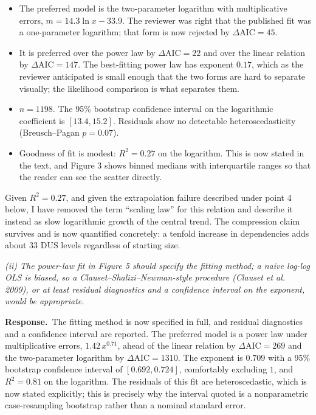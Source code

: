 \documentclass[11pt,a4paper]{article}
\newcommand{\rev}[1]{\medskip\noindent\textit{#1}\par\medskip}
\newcommand{\reply}{\noindent\textbf{Response.}\ }
\begin{document}
\begin{itemize}
\item The preferred model is the two-parameter logarithm with multiplicative
errors, $m = 14.3\ln x - 33.9$. The reviewer was right that the published fit
was a one-parameter logarithm; that form is now rejected by
$\Delta\mathrm{AIC} = 45$.
\item It is preferred over the power law by $\Delta\mathrm{AIC} = 22$ and over
the linear relation by $\Delta\mathrm{AIC} = 147$. The best-fitting power law
has exponent $0.17$, which as the reviewer anticipated is small enough that the
two forms are hard to separate visually; the likelihood comparison is what
separates them.
\item $n = 1198$. The 95\% bootstrap confidence interval on the logarithmic
coefficient is $[13.4, 15.2]$. Residuals show no detectable heteroscedasticity
(Breusch--Pagan $p = 0.07$).
\item Goodness of fit is modest: $R^2 = 0.27$ on the logarithm. This is now
stated in the text, and Figure 3 shows binned medians with interquartile ranges
so that the reader can see the scatter directly.
\end{itemize}

Given $R^2 = 0.27$, and given the extrapolation failure described under point 4
below, I have removed the term ``scaling law'' for this relation and describe it
instead as slow logarithmic growth of the central trend. The compression claim
survives and is now quantified concretely: a tenfold increase in dependencies
adds about 33 DUS levels regardless of starting size.

\rev{(ii) The power-law fit in Figure 5 should specify the fitting method; a naive
log-log OLS is biased, so a Clauset--Shalizi--Newman-style procedure (Clauset et
al. 2009), or at least residual diagnostics and a confidence interval on the
exponent, would be appropriate.}

\reply The fitting method is now specified in full, and residual diagnostics and
a confidence interval are reported. The preferred model is a power law under
multiplicative errors, $1.42\,x^{0.71}$, ahead of the linear relation by
$\Delta\mathrm{AIC} = 269$ and the two-parameter logarithm by
$\Delta\mathrm{AIC} = 1310$. The exponent is $0.709$ with a 95\% bootstrap
confidence interval of $[0.692, 0.724]$, comfortably excluding $1$, and
$R^2 = 0.81$ on the logarithm. The residuals of this fit are heteroscedastic,
which is now stated explicitly; this is precisely why the interval quoted is a
nonparametric case-resampling bootstrap rather than a nominal standard error.
\end{document}
